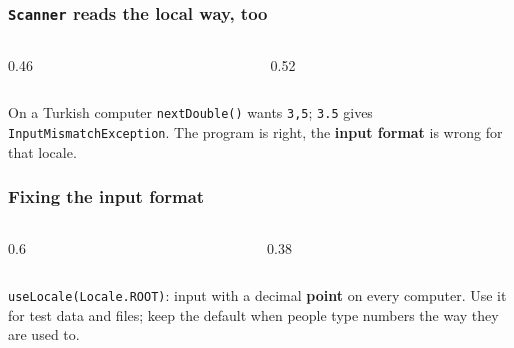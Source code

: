 \documentclass[aspectratio=169,10pt,compress]{beamer}
\begin{document}




\begin{frame}[t,fragile] \frametitle{\texttt{Scanner} reads the local way, too}
  \begin{columns}[T]
    \begin{column}{0.46\textwidth}
    \end{column}
    \begin{column}{0.52\textwidth}
    \end{column}
  \end{columns}
  \vspace{0.1em}
  \small On a Turkish computer \texttt{nextDouble()} wants \texttt{3,5}; \texttt{3.5} gives
  \texttt{InputMismatchException}. The program is right, the \textbf{input format} is wrong for that locale.
\end{frame}




\begin{frame}[t,fragile] \frametitle{Fixing the input format}
  \begin{columns}[T]
    \begin{column}{0.6\textwidth}
    \end{column}
    \begin{column}{0.38\textwidth}
    \end{column}
  \end{columns}
  \vspace{0.2em}
  \small \texttt{useLocale(Locale.ROOT)}: input with a decimal \textbf{point} on every computer.
  Use it for test data and files; keep the default when people type numbers the way they are used to.
\end{frame}
\end{document}
